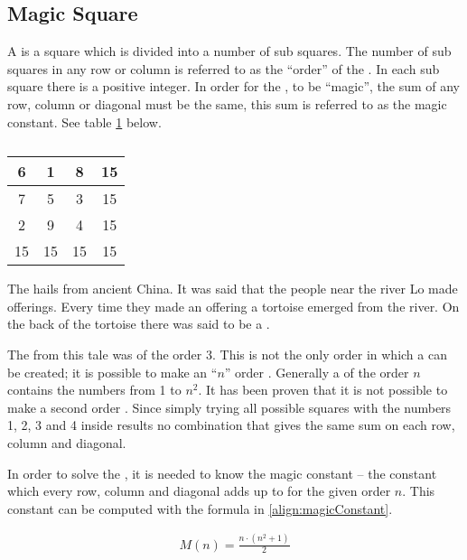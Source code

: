 \subsection{Magic Square}
\label{sec:magicSquare}
A \msquare{} is a square which is divided into a number of sub squares. The number of sub squares in any row or column is referred to as the ``order'' of the \msquare{}. In each sub square there is a positive integer. In order for the \msquare{}, to be ``magic'', the sum of any row, column or diagonal must be the same, this sum is referred to as the magic constant. See table \ref{tab:magicSquareOrder3} below.

\renewcommand{\arraystretch}{1.3}
\begin{table}[h]
	\centering
		\begin{tabular}{|c|c|c |@{\vrules}| c|}
			\hline
			6&1&8&15 \\
			\hline
			7&5&3&15 \\
			\hline
			2&9&4&15 \\
			\noalign{\hrules}
			15&15&15&15 \\
			\hline
		\end{tabular}
	\caption{}
	\label{tab:magicSquareOrder3}
\end{table}

The \msquare{}\cite{aiden06} hails from ancient China. It was said that the people near the river Lo made offerings. Every time they made an offering a tortoise emerged from the river. On the back of the tortoise there was said to be a \msquare{}.

The \msquare{} from this tale was of the order 3. This is not the only order in which a \msquare{} can be created; it is possible to make an ``$n$'' order \msquare{}. Generally a \msquare{} of the order $n$ contains the numbers from 1 to $n^2$. It has been proven that it is not possible to make a second order \msquare{}. Since simply trying all possible squares with the numbers 1, 2, 3 and 4 inside results no combination that gives the same sum on each row, column and diagonal.

In order to solve the \msquare{}, it is needed to know the magic constant -- the constant which every row, column and diagonal adds up to for the given order $n$. This constant can be computed with the formula in \ref{align:magicConstant}.

\begin{align}
\label{align:magicConstant}
	M(n) = \frac{n \cdot (n^2+1)}{2}
\end{align}

